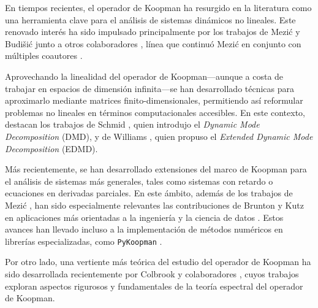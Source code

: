 En tiempos recientes, el operador de Koopman ha resurgido en la literatura como una herramienta clave para el análisis de sistemas dinámicos no lineales. Este renovado interés ha sido impulsado principalmente por los trabajos de Mezić y Budišić junto a otros colaboradores \cite{Budisic2009AnObservables, Budisic2012GeometryFlows, Budisic2012AppliedKoopmanism}, línea que continuó Mezić en conjunto con múltiples coautores \cite{Rowley2009SpectralFlows, Susuki2011NonlinearDynamics, Mezic2013AnalysisOperator, Mauroy2013IsostablesDynamics, Lan2013LinearizationSpectrum, Korda2018OnOperator, Korda2018LinearControl, Arbabi2017ErgodicOperator, Arbabi2017StudyDecomposition, Mauroy2020TheControl, Korda2020OptimalControl, Korda2020Data-drivenOperator, Mezic2020SpectrumGeometry, Mezic2022OnOperator, Mezic2024ACases}.  

Aprovechando la linealidad del operador de Koopman—aunque a costa de trabajar en espacios de dimensión infinita—se han desarrollado técnicas para aproximarlo mediante matrices finito-dimensionales, permitiendo así reformular problemas no lineales en términos computacionales accesibles. En este contexto, destacan los trabajos de Schmid \cite{Schmid2008DynamicData}, quien introdujo el \textit{Dynamic Mode Decomposition} (DMD), y de Williams \cite{Williams2015ADecomposition}, quien propuso el \textit{Extended Dynamic Mode Decomposition} (EDMD).  

Más recientemente, se han desarrollado extensiones del marco de Koopman para el análisis de sistemas más generales, tales como sistemas con retardo o ecuaciones en derivadas parciales. En este ámbito, además de los trabajos de Mezić \cite{Mezic2013AnalysisOperator, Mezic2020SpectrumGeometry, Mezic2022OnOperator}, han sido especialmente relevantes las contribuciones de Brunton y Kutz en aplicaciones más orientadas a la ingeniería y la ciencia de datos \cite{Tu2014OnApplications, Brunton2016KoopmanControl, Proctor2018GeneralizingControl, NathanKutz2018AppliedSystems, Lusch2018DeepDynamics, Brunton2019Data-DrivenControl, Kamb2020Time-delayApplications, Kaiser2021Data-drivenControl, Brunton2022ModernSystems, Baddoo2022KernelOptimization, Baddoo2023Physics-informedDecomposition}. Estos avances han llevado incluso a la implementación de métodos numéricos en librerías especializadas, como \texttt{PyKoopman} \cite{Pan2024PyKoopman:Operator}.  

Por otro lado, una vertiente más teórica del estudio del operador de Koopman ha sido desarrollada recientemente por Colbrook y colaboradores \cite{Colbrook2023ResidualKoopmanism, Colbrook2023THESYSTEMS, Colbrook2024TheAlgorithms, Colbrook2024RiggedOperators, Colbrook2024RigorousSystems, Colbrook2024LimitsLearning, Zagli2024BridgingResponse}, cuyos trabajos exploran aspectos rigurosos y fundamentales de la teoría espectral del operador de Koopman.  

